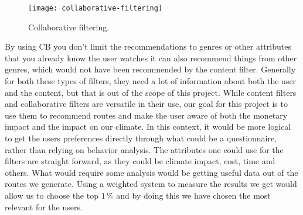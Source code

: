\begin{figure}
    \centering
    \texttt{[image: collaborative-filtering]}
    \caption{Collaborative filtering.}
    \label{fig:figure4}
\end{figure}

By using CB you don't limit the recommendations to genres or other attributes that you already know the user watches it
can also recommend things from other genres, which would not have been recommended by the content filter.\newline
Generally for both these types of filters, they need a lot of information about both the user and the content, but that
is out of the scope of this project.
While content filters and collaborative filters are versatile in their use, our goal for this project is to use them to
recommend routes and make the user aware of both the monetary impact and the impact on our climate.
In this context, it would be more logical to get the users preferences directly through what could be a questionnaire,
rather than relying on behavior analysis.
The attributes one could use for the filters are straight forward, as they could be climate impact, cost, time and
others.
What would require some analysis would be getting useful data out of the routes we generate.
Using a weighted system to measure the results we get would allow us to choose the top \(1\,\%\) and by doing this we
have chosen the most relevant for the users.
